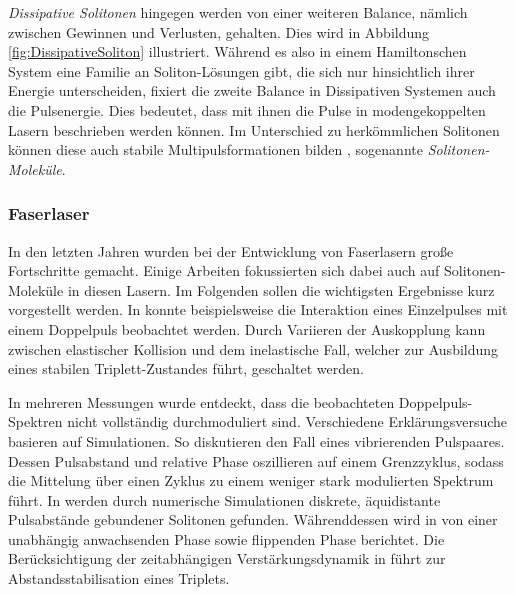 \documentclass[bachelor,       %
               twoside,        %
               BCOR10mm,       %
               liststotoc,nomtotoc,bibtotoc, %
               english,ngerman, %
               final,          %
               ]{GAUBM}
\begin{document}
\textit{Dissipative Solitonen} hingegen werden von einer weiteren Balance, nämlich zwischen Gewinnen und Verlusten, gehalten.
Dies wird in Abbildung \ref{fig:DissipativeSoliton} illustriert.
Während es also in einem Hamiltonschen System eine Familie an Soliton-Lösungen gibt, die sich nur hinsichtlich ihrer Energie unterscheiden, fixiert die zweite Balance in Dissipativen Systemen auch die Pulsenergie.
Dies bedeutet, dass mit ihnen die Pulse in modengekoppelten Lasern \cite{grelu_dissipative_2012} beschrieben werden können.
Im Unterschied zu herkömmlichen Solitonen können diese auch stabile Multipulsformationen bilden \cite{ankiewicz_dissipative_2008}, sogenannte \textit{Solitonen-Moleküle}.

\subsubsection{Faserlaser}
In den letzten Jahren wurden bei der Entwicklung von Faserlasern große Fortschritte gemacht.
Einige Arbeiten fokussierten sich dabei auch auf Solitonen-Moleküle in diesen Lasern.
Im Folgenden sollen die wichtigsten Ergebnisse kurz vorgestellt werden.
In \cite{grelu_group_2004} konnte beispielsweise die Interaktion eines Einzelpulses mit einem Doppelpuls beobachtet werden.
Durch Variieren der Auskopplung kann zwischen elastischer Kollision und dem inelastische Fall, welcher zur Ausbildung eines stabilen Triplett-Zustandes führt, geschaltet werden. 

In mehreren Messungen wurde entdeckt, dass die beobachteten Doppelpuls-Spektren nicht vollständig durchmoduliert sind.
Verschiedene Erklärungsversuche basieren auf Simulationen. 
So diskutieren \cite{grapinet_vibrating_2006} den Fall eines vibrierenden Pulspaares.
Dessen Pulsabstand und relative Phase oszillieren auf einem Grenzzyklus, sodass die Mittelung über einen Zyklus zu einem weniger stark modulierten Spektrum führt.
In \cite{zavyalov_discrete_2009} werden durch numerische Simulationen diskrete, äquidistante Pulsabstände gebundener Solitonen gefunden.
Währenddessen wird in \cite{zavyalov_dissipative_2009} von einer unabhängig anwachsenden Phase sowie flippenden Phase berichtet.
Die Berücksichtigung der zeitabhängigen Verstärkungsdynamik in \cite{zaviyalov_impact_2012} führt zur Abstandsstabilisation eines Triplets.

\end{document}
